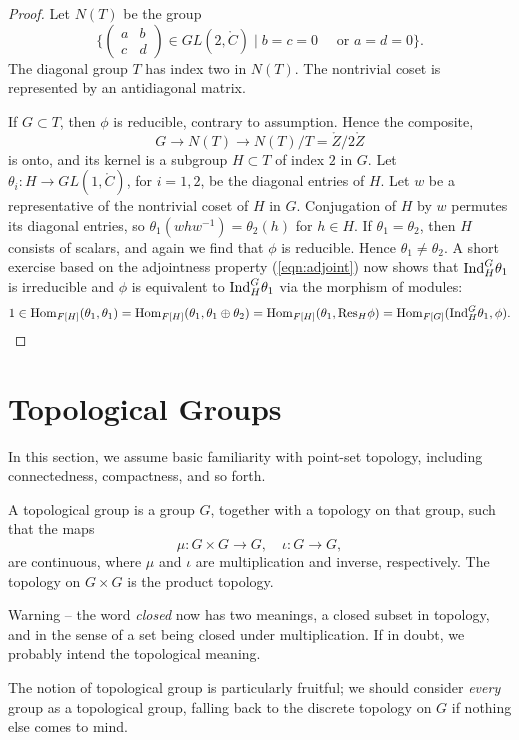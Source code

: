 \documentclass{amsart}
\begin{document}
\begin{proof}
Let $N(T)$ be the group 
\[
\{\begin{pmatrix} a & b \\ c & d\end{pmatrix} \in GL(2,\ring{C}) \mid
b = c =0 \quad \text{ or } a = d = 0\}.
\]
The diagonal group $T$ has index two in $N(T)$.
The nontrivial coset is represented by an  antidiagonal matrix.

If $G\subset T$, then $\phi$ is reducible,
contrary to assumption.  Hence the composite,
\[
G\to N(T)\to N(T)/T = \ring{Z}/2\ring{Z}
\]
is onto, and its kernel is a subgroup $H\subset T$ of index $2$ in $G$.
Let
$\theta_i:H\to GL(1,\ring{C})$, for $i=1,2$, be the diagonal entries
of $H$.  Let $w$ be a representative of the nontrivial coset of $H$ in
$G$.  Conjugation of $H$ by $w$ permutes its diagonal entries, so
$\theta_1(w h w^{-1}) = \theta_2(h)$ for $h\in H$.  If
$\theta_1=\theta_2$, then $H$ consists of scalars, and again we find
that $\phi$ is reducible.  Hence $\theta_1\ne\theta_2$.  A short
exercise based on the adjointness property (\ref{eqn:adjoint}) now
shows that ${\operatorname{Ind}}_H^G\theta_1$ is irreducible and $\phi$ is
equivalent to ${\operatorname{Ind}}_H^G\theta_1$ via the morphism of modules:
\[
1\in{\operatorname{Hom}}_{F[H]}(\theta_1,\theta_1)={\operatorname{Hom}}_{F[H]}(\theta_1,\theta_1\oplus\theta_2)=
{\operatorname{Hom}}_{F[H]}(\theta_1,{\operatorname{Res}}_H\phi) = {\operatorname{Hom}}_{F[G]}({\operatorname{Ind}}_H^G\theta_1,\phi).
\]
\end{proof}

\newpage
\section{Topological Groups}

In this section, we assume basic familiarity with point-set topology,
including connectedness, compactness, and so forth. 

A topological group is a group $G$, together with a topology on that
group, such that the maps
\[
\mu:G\times G\to G,\quad \iota:G\to G,
\]
are continuous, where $\mu$ and $\iota$ are multiplication and
inverse, respectively.  The topology on $G\times G$ is the product
topology.

Warning -- the word {\it closed} now has two meanings, a closed subset
in topology, and in the sense of a set being closed under
multiplication.  If in doubt, we probably intend the topological
meaning.

The notion of topological group is particularly fruitful; we should
consider {\it every} group as a topological group, falling back to the
discrete topology on $G$ if nothing else comes to mind.
\end{document}

